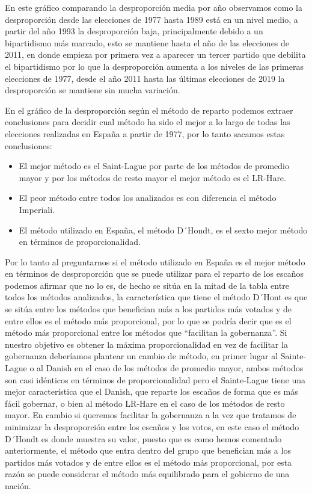 \documentclass[12pt,a4paper,]{book}
\providecommand{\tightlist}{%
  \setlength{\itemsep}{0pt}\setlength{\parskip}{0pt}}
\numberwithin{dummy}{section}
\theoremstyle{ocrenumbox}
\theoremstyle{blacknumex}
\theoremstyle{blacknumbox}
\theoremstyle{ocrenum}
\theoremstyle{ocrenum}
\begin{document}
En este gráfico comparando la desproporción media por año observamos
como la desproporción desde las elecciones de 1977 hasta 1989 está en un
nivel medio, a partir del año 1993 la desproporción baja, principalmente
debido a un bipartidismo más marcado, esto se mantiene hasta el año de
las elecciones de 2011, en donde empieza por primera vez a aparecer un
tercer partido que debilita el bipartidismo por lo que la desproporción
aumenta a los niveles de las primeras elecciones de 1977, desde el año
2011 hasta las últimas elecciones de 2019 la desproporción se mantiene
sin mucha variación.

En el gráfico de la desproporción según el método de reparto podemos
extraer conclusiones para decidir cual método ha sido el mejor a lo
largo de todas las elecciones realizadas en España a partir de 1977, por
lo tanto sacamos estas conclusiones:

\begin{itemize}
\tightlist
\item
  El mejor método es el Saint-Lague por parte de los métodos de promedio
  mayor y por los métodos de resto mayor el mejor método es el LR-Hare.
\item
  El peor método entre todos los analizados es con diferencia el método
  Imperiali.
\item
  El método utilizado en España, el método D´Hondt, es el sexto mejor
  método en términos de proporcionalidad.
\end{itemize}

Por lo tanto al preguntarnos si el método utilizado en España es el
mejor método en términos de desproporción que se puede utilizar para el
reparto de los escaños podemos afirmar que no lo es, de hecho se sitúa
en la mitad de la tabla entre todos los métodos analizados, la
característica que tiene el método D´Hont es que se sitúa entre los
métodos que benefician más a los partidos más votados y de entre ellos
es el método más proporcional, por lo que se podría decir que es el
método más proporcional entre los métodos que ``facilitan la
gobernanza''. Si nuestro objetivo es obtener la máxima proporcionalidad
en vez de facilitar la gobernanza deberíamos plantear un cambio de
método, en primer lugar al Sainte-Lague o al Danish en el caso de los
métodos de promedio mayor, ambos métodos son casi idénticos en términos
de proporcionalidad pero el Sainte-Lague tiene una mejor característica
que el Danish, que reparte los escaños de forma que es más fácil
gobernar, o bien al método LR-Hare en el caso de los métodos de resto
mayor. En cambio si queremos facilitar la gobernanza a la vez que
tratamos de minimizar la desproporción entre los escaños y los votos, en
este caso el método D´Hondt es donde muestra su valor, puesto que es
como hemos comentado anteriormente, el método que entra dentro del grupo
que benefician más a los partidos más votados y de entre ellos es el
método más proporcional, por esta razón se puede considerar el método
más equilibrado para el gobierno de una nación.
\end{document}
